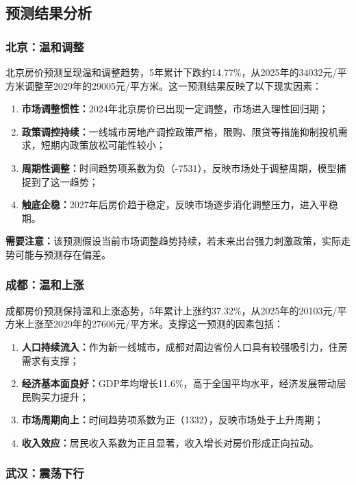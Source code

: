 \documentclass[12pt,a4paper]{article}
\begin{document}
\subsection{预测结果分析}

\subsubsection{北京：温和调整}

北京房价预测呈现温和调整趋势，5年累计下跌约14.77\%，从2025年的34032元/平方米调整至2029年的29005元/平方米。这一预测结果反映了以下现实因素：
\begin{enumerate}
    \item \textbf{市场调整惯性：}2024年北京房价已出现一定调整，市场进入理性回归期；
    \item \textbf{政策调控持续：}一线城市房地产调控政策严格，限购、限贷等措施抑制投机需求，短期内政策放松可能性较小；
    \item \textbf{周期性调整：}时间趋势项系数为负（-7531），反映市场处于调整周期，模型捕捉到了这一趋势；
    \item \textbf{触底企稳：}2027年后房价趋于稳定，反映市场逐步消化调整压力，进入平稳期。
\end{enumerate}

\textbf{需要注意：}该预测假设当前市场调整趋势持续，若未来出台强力刺激政策，实际走势可能与预测存在偏差。

\subsubsection{成都：温和上涨}

成都房价预测保持温和上涨态势，5年累计上涨约37.32\%，从2025年的20103元/平方米上涨至2029年的27606元/平方米。支撑这一预测的因素包括：
\begin{enumerate}
    \item \textbf{人口持续流入：}作为新一线城市，成都对周边省份人口具有较强吸引力，住房需求有支撑；
    \item \textbf{经济基本面良好：}GDP年均增长11.6\%，高于全国平均水平，经济发展带动居民购买力提升；
    \item \textbf{市场周期向上：}时间趋势项系数为正（1332），反映市场处于上升周期；
    \item \textbf{收入效应：}居民收入系数为正且显著，收入增长对房价形成正向拉动。
\end{enumerate}

\subsubsection{武汉：震荡下行}
\end{document}
